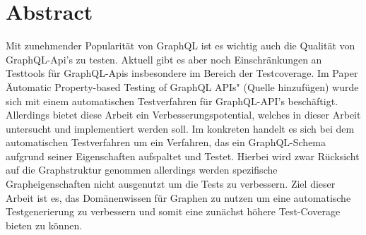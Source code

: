 \chapter{Abstract}

Mit zunehmender Popularität von GraphQL ist es wichtig auch die Qualität von GraphQL-Api's zu testen.
Aktuell gibt es aber noch Einschränkungen an Testtools für GraphQL-Apis insbesondere im Bereich der
Testcoverage. Im Paper \"Automatic Property-based Testing of
GraphQL APIs" (Quelle hinzufügen) wurde sich mit einem automatischen Testverfahren für GraphQL-API's beschäftigt.
Allerdings bietet diese Arbeit ein Verbesserungspotential, welches in dieser Arbeit untersucht und implementiert werden soll.
Im konkreten handelt es sich bei dem automatischen Testverfahren um ein Verfahren, das ein GraphQL-Schema aufgrund seiner
Eigenschaften aufspaltet und Testet. Hierbei wird zwar Rücksicht auf die Graphstruktur genommen allerdings werden spezifische
Grapheigenschaften nicht ausgenutzt um die Tests zu verbessern. Ziel dieser Arbeit ist es, das Domänenwissen für Graphen zu nutzen
um eine automatische Testgenerierung zu verbessern und somit eine zunächst höhere Test-Coverage bieten zu können.
